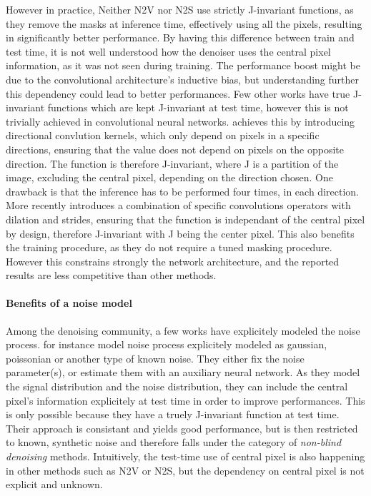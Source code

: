 \documentclass{article}
\begin{document}
However in practice, Neither N2V nor N2S use strictly J-invariant functions, as they remove the masks at inference time,
effectively using all the pixels, resulting in significantly better performance. By having this difference between train and test time, it is not well understood how the denoiser uses the central pixel information, as it was not seen during training. The performance boost might be due to the convolutional architecture's inductive bias, but understanding further this dependency could lead to better performances.
Few other works have true J-invariant functions which are kept J-invariant at test time, however this is not trivially achieved in convolutional neural networks. \cite{laine2019high} achieves this by introducing directional convlution kernels, which only depend on pixels in a specific directions, ensuring that the value does not depend on pixels on the opposite direction. The function is therefore J-invariant, where J is a partition of the image, excluding the central pixel, depending on the direction chosen. One drawback is that the inference has to be performed four times, in each direction.
More recently \cite{lee2020noise2kernel} introduces a combination of specific convolutions operators with dilation and strides, ensuring that the function is independant of the central pixel by design, therefore J-invariant with J being the center pixel. This also benefits the training procedure, as they do not require a tuned masking procedure. However this constrains strongly the network architecture, and the reported results are less competitive than other methods.

\paragraph{Benefits of a noise model}
Among the denoising community, a few works have explicitely modeled the noise process. \cite{laine2019high} for instance model noise process explicitely modeled as gaussian, poissonian or another type of known noise. They either fix the noise parameter(s), or estimate them with an auxiliary neural network. As they model the signal distribution and the noise distribution, they can include the central pixel's information explicitely at test time in order to improve performances. This is only possible because they have a truely J-invariant function at test time. Their approach is consistant and yields good performance, but is then restricted to known, synthetic noise and therefore falls under the category of \textit{non-blind denoising} methods.
Intuitively, the test-time use of central pixel is also happening in other methods such as N2V or N2S, but the dependency on central pixel is not explicit and unknown.
\end{document}
